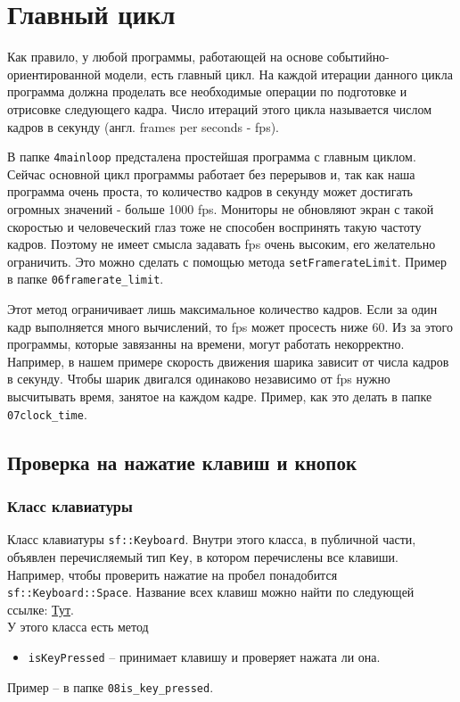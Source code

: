 \documentclass{article}
\begin{document}
\newpage
\section{Главный цикл}
Как правило, у любой программы, работающей на основе событийно-ориентированной модели, есть главный цикл. На каждой итерации данного цикла программа должна проделать все необходимые операции по подготовке и отрисовке следующего кадра. Число итераций этого цикла называется числом кадров в секунду (англ. frames per seconds - fps).

В папке \texttt{4mainloop} предсталена простейшая программа с главным циклом. Сейчас основной цикл программы работает без перерывов и, так как наша программа очень проста, то количество кадров в секунду может достигать огромных значений - больше 1000 fps. Мониторы не обновляют экран с такой скоростью и человеческий глаз тоже не способен воспринять такую частоту кадров. Поэтому не имеет смысла задавать fps очень высоким, его желательно ограничить. Это можно сделать с помощью метода \texttt{setFramerateLimit}. Пример в папке \texttt{06framerate\_limit}.

Этот метод ограничивает лишь максимальное количество кадров. Если за один кадр выполняется много вычислений, то fps может просесть ниже 60. Из за этого программы, которые завязанны на времени, могут работать некорректно. Например, в нашем примере скорость движения шарика зависит от числа кадров в секунду. Чтобы шарик двигался одинаково независимо от fps нужно высчитывать время, занятое на каждом кадре. Пример, как это делать в папке \texttt{07clock\_time}.



\subsection*{Проверка на нажатие клавиш и кнопок}
\subsubsection*{Класс клавиатуры}
Класс клавиатуры \texttt{sf::Keyboard}. Внутри этого класса, в публичной части, объявлен перечисляемый тип \texttt{Key}, в котором перечислены все клавиши. Например, чтобы проверить нажатие на пробел понадобится \texttt{sf::Keyboard::Space}. Название всех клавиш можно найти по следующей ссылке: \href{https://www.sfml-dev.org/documentation/2.5.1/classsf_1_1Keyboard.php}{Тут}.\\
У этого класса есть метод 
\begin{itemize}
\item \texttt{isKeyPressed} -- принимает клавишу и проверяет нажата ли она.
\end{itemize}
Пример -- в папке \texttt{08is\_key\_pressed}.
\end{document}
